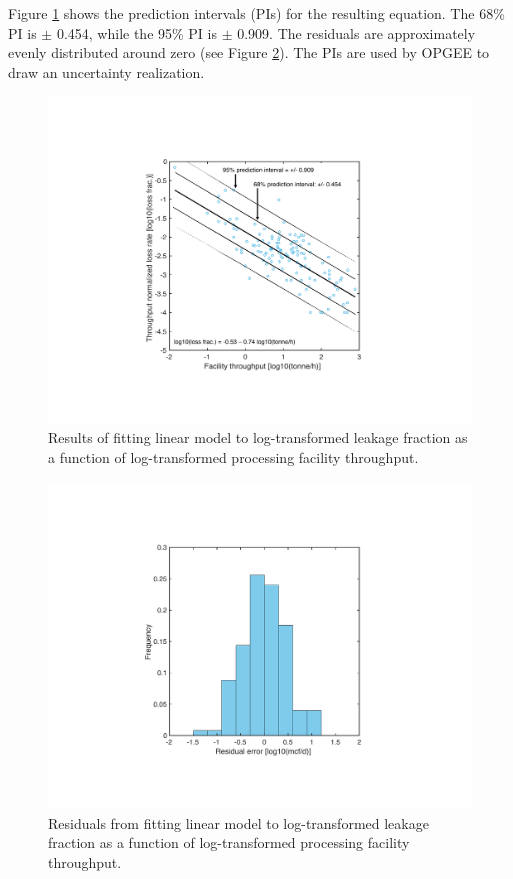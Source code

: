 \documentclass[11pt]{report}
\begin{document}
Figure \ref{fig:mitchell_fit_processing_plant_VF} shows the prediction intervals (PIs) for the resulting equation. The 68\% PI is $\pm$ 0.454, while the 95\% PI is $\pm$ 0.909. The residuals are approximately evenly distributed around zero (see Figure \ref{fig:mitchell_fit_processing_plant_residuals}). The PIs are used by OPGEE to draw an uncertainty realization.
 
 \begin{figure}[t]
\includegraphics[width=0.8\columnwidth]{images/MitchellFitA.pdf}
\caption{Results of fitting linear model to log-transformed leakage fraction as a function of log-transformed processing facility throughput.}
\label{fig:mitchell_fit_processing_plant_VF}
\end{figure} 

 \begin{figure}[t]
\includegraphics[width=0.8\columnwidth]{images/MitchellFitB.pdf}
\caption{Residuals from fitting linear model to log-transformed leakage fraction as a function of log-transformed processing facility throughput.}
\label{fig:mitchell_fit_processing_plant_residuals}
\end{figure} 
 
\end{document}
